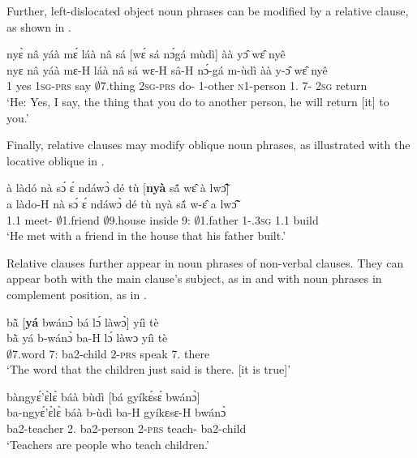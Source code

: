 Further, left-dislocated object noun phrases can be modified by a relative clause, as shown in .


\ea\label{REL5}
  \glll nyɛ̀ nâ yáà mɛ́ láà nâ sá [wɛ́ sá nɔ́gá mùdì]\textsubscript{{\REL}} àà yɔ̂ wɛ̂ nyê \\
      nyɛ nâ yáà mɛ-H láà nâ sá {\db}wɛ-H sâ-H nɔ́-gá m-ùdì àà y-ɔ̂ wɛ̂ nyê\\
        1 {\COMP} yes 1\textsc{sg}-\textsc{prs} say {\COMP} $\emptyset$7.thing {\db}2\textsc{sg}-\textsc{prs} do-{\R} 1-other \textsc{n}1-person 1.{\FUT} 7-{\OBJ} 2\textsc{sg} return\\
    \trans `He: Yes, I say, the thing that you do to another person, he will return [it] to you.'
\z

\noindent Finally, relative clauses may modify oblique noun phrases, as illustrated with the locative oblique in .


\ea\label{REL6}
  \glll à làdó nà sɔ́ ɛ́ ndáwɔ̀ dé tù [{\bfseries nyà} sã́ wɛ̂ à lwɔ̃̂]\textsubscript{{\REL}} \\
      a làdo-H nà sɔ́ ɛ́ ndáwɔ̀ dé tù {\db}nyà sã́ w-ɛ̂ a lwɔ̃̂\\
      1.{\PST}1 meet-{\R} {\COM} $\emptyset$1.friend {\LOC} $\emptyset$9.house {\LOC} inside {\db}9:{\ATT} $\emptyset$1.father 1-{\POSS}.3\textsc{sg} 1.{\PST}1 build  \\
    \trans `He met with a friend in the house that his father built.'
\z

Relative clauses further appear in noun phrases of non-verbal clauses. They can appear both with the main clause's subject, as in  and with noun phrases in complement position, as in .


\ea\label{REL2} 
  \glll  bã̀ [{\bfseries yá} bwánɔ̀ bá lɔ́ làwɔ̀]\textsubscript{{\REL}} yíì tè \\
         bã̀ {\db}yá b-wánɔ̀ ba-H lɔ́ làwɔ yíì tè \\
         $\emptyset$7.word {\db}7:{\ATT} ba2-child 2-\textsc{prs} {\RETRO} speak 7.{\COP} there \\
    \trans `The word that the children just said is there. [it is true]'
\z



\ea\label{REL2b} 
  \glll  bàngyɛ́'ɛ̀lɛ̀ báà bùdì [bá gyíkɛ́sɛ́ bwánɔ̀]\textsubscript{{\REL}} \\
         ba-ngyɛ́'ɛ̀lɛ̀ báà b-ùdì {\db}ba-H gyíkɛsɛ-H bwánɔ̀ \\
         ba2-teacher 2.{\COP} ba2-person {\db}2-\textsc{prs} teach-{\R} ba2-child \\
    \trans `Teachers are people who teach children.'
\z


